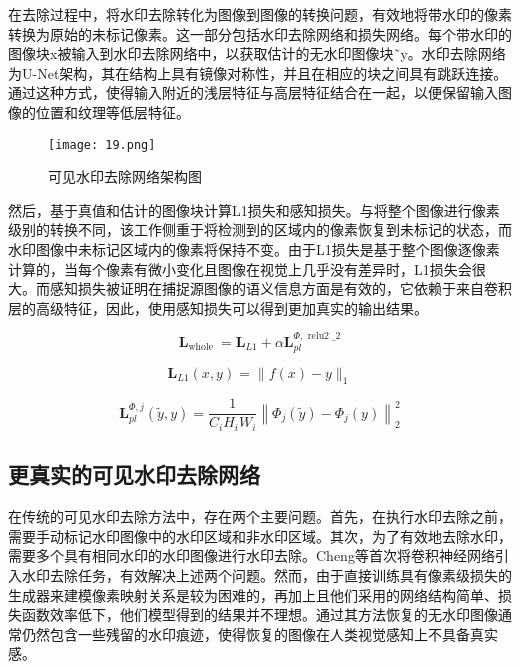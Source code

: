 在去除过程中，将水印去除转化为图像到图像的转换问题，有效地将带水印的像素转换为原始的未标记像素。这一部分包括水印去除网络和损失网络。每个带水印的图像块x被输入到水印去除网络中，以获取估计的无水印图像块˜y。水印去除网络为U-Net架构，其在结构上具有镜像对称性，并且在相应的块之间具有跳跃连接。通过这种方式，使得输入附近的浅层特征与高层特征结合在一起，以便保留输入图像的位置和纹理等低层特征。

\begin{figure}[!htbp]
	\centering
	\texttt{[image: 19.png]}
	\caption{可见水印去除网络架构图}
	\label{fig:19}
\end{figure}

然后，基于真值和估计的图像块计算L1损失和感知损失。与将整个图像进行像素级别的转换不同，该工作侧重于将检测到的区域内的像素恢复到未标记的状态，而水印图像中未标记区域内的像素将保持不变。由于L1损失是基于整个图像逐像素计算的，当每个像素有微小变化且图像在视觉上几乎没有差异时，L1损失会很大。而感知损失被证明在捕捉源图像的语义信息方面是有效的，它依赖于来自卷积层的高级特征，因此，使用感知损失可以得到更加真实的输出结果。

\begin{equation}
\boldsymbol{L}_{\text {whole }}=\boldsymbol{L}_{L 1}+\alpha \boldsymbol{L}_{p l}^{\Phi, \text { relu2 } \_2}
\end{equation}

\begin{equation}
\boldsymbol{L}_{L 1}(x, y)=\|f(x)-y\|_1
\end{equation}

\begin{equation}
\boldsymbol{L}_{p l}^{\Phi, j}(\tilde{y}, y)=\frac{1}{C_i H_i W_i}\left\|\Phi_j(\tilde{y})-\Phi_j(y)\right\|_2^2
\end{equation}

\subsection{更真实的可见水印去除网络}

在传统的可见水印去除方法中，存在两个主要问题。首先，在执行水印去除之前，需要手动标记水印图像中的水印区域和非水印区域。其次，为了有效地去除水印，需要多个具有相同水印的水印图像进行水印去除。Cheng等首次将卷积神经网络引入水印去除任务，有效解决上述两个问题。然而，由于直接训练具有像素级损失的生成器来建模像素映射关系是较为困难的，再加上且他们采用的网络结构简单、损失函数效率低下，他们模型得到的结果并不理想。通过其方法恢复的无水印图像通常仍然包含一些残留的水印痕迹，使得恢复的图像在人类视觉感知上不具备真实感。

